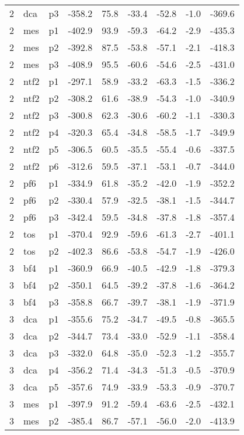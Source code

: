 \documentclass[a4paper]{article}
\begin{document}
\begin{table}[ht]
\begin{tabular}{rllrrrrrr}
   2 & dca & p3 & -358.2 & 75.8 & -33.4 & -52.8 & -1.0 & -369.6 \\ 
   2 & mes & p1 & -402.9 & 93.9 & -59.3 & -64.2 & -2.9 & -435.3 \\ 
   2 & mes & p2 & -392.8 & 87.5 & -53.8 & -57.1 & -2.1 & -418.3 \\ 
   2 & mes & p3 & -408.9 & 95.5 & -60.6 & -54.6 & -2.5 & -431.0 \\ 
   2 & ntf2 & p1 & -297.1 & 58.9 & -33.2 & -63.3 & -1.5 & -336.2 \\ 
   2 & ntf2 & p2 & -308.2 & 61.6 & -38.9 & -54.3 & -1.0 & -340.9 \\ 
   2 & ntf2 & p3 & -300.8 & 62.3 & -30.6 & -60.2 & -1.1 & -330.3 \\ 
   2 & ntf2 & p4 & -320.3 & 65.4 & -34.8 & -58.5 & -1.7 & -349.9 \\ 
   2 & ntf2 & p5 & -306.5 & 60.5 & -35.5 & -55.4 & -0.6 & -337.5 \\ 
   2 & ntf2 & p6 & -312.6 & 59.5 & -37.1 & -53.1 & -0.7 & -344.0 \\ 
   2 & pf6 & p1 & -334.9 & 61.8 & -35.2 & -42.0 & -1.9 & -352.2 \\ 
   2 & pf6 & p2 & -330.4 & 57.9 & -32.5 & -38.1 & -1.5 & -344.7 \\ 
   2 & pf6 & p3 & -342.4 & 59.5 & -34.8 & -37.8 & -1.8 & -357.4 \\ 
   2 & tos & p1 & -370.4 & 92.9 & -59.6 & -61.3 & -2.7 & -401.1 \\ 
   2 & tos & p2 & -402.3 & 86.6 & -53.8 & -54.7 & -1.9 & -426.0 \\ 
   3 & bf4 & p1 & -360.9 & 66.9 & -40.5 & -42.9 & -1.8 & -379.3 \\ 
   3 & bf4 & p2 & -350.1 & 64.5 & -39.2 & -37.8 & -1.6 & -364.2 \\ 
   3 & bf4 & p3 & -358.8 & 66.7 & -39.7 & -38.1 & -1.9 & -371.9 \\ 
   3 & dca & p1 & -355.6 & 75.2 & -34.7 & -49.5 & -0.8 & -365.5 \\ 
   3 & dca & p2 & -344.7 & 73.4 & -33.0 & -52.9 & -1.1 & -358.4 \\ 
   3 & dca & p3 & -332.0 & 64.8 & -35.0 & -52.3 & -1.2 & -355.7 \\ 
   3 & dca & p4 & -356.2 & 71.4 & -34.3 & -51.3 & -0.5 & -370.9 \\ 
   3 & dca & p5 & -357.6 & 74.9 & -33.9 & -53.3 & -0.9 & -370.7 \\ 
   3 & mes & p1 & -397.9 & 91.2 & -59.4 & -63.6 & -2.5 & -432.1 \\ 
   3 & mes & p2 & -385.4 & 86.7 & -57.1 & -56.0 & -2.0 & -413.9 \\ 

\end{tabular}
\end{table}
\end{document}
